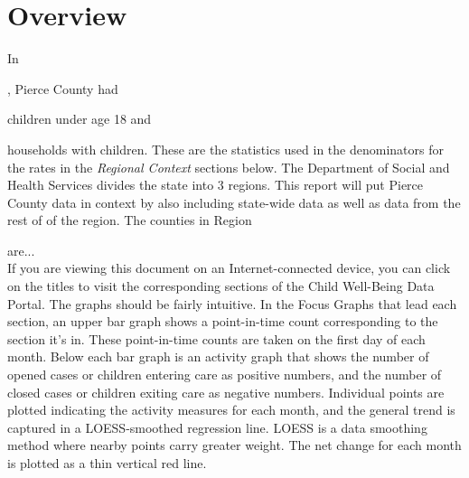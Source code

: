 \documentclass{article}
\begin{document}

\vspace{12pt}

\section*{Overview}

In 

{\ttfamily\noindent\bfseries\color{errorcolor}{\\Error in eval(expr, envir, enclos) : object 'context\_year' not found}}, Pierce County had {

{\ttfamily\noindent\bfseries\color{errorcolor}{\\Error in formatC(focus\_pop\_person, big.mark = ",", format = "d") : \\\ \ object 'focus\_pop\_person' not found}}} children under age 18 and {

{\ttfamily\noindent\bfseries\color{errorcolor}{\\Error in formatC(focus\_pop\_house, big.mark = ",", format = "d") : \\\ \ object 'focus\_pop\_house' not found}}} households with children. These are the statistics used in the denominators for the rates in the \emph{Regional Context} sections below. The Department of Social and Health Services divides the state into 3 regions. This report will put Pierce County data in context by also including state-wide data as well as data from the rest of of the region. The counties in Region 

{\ttfamily\noindent\bfseries\color{errorcolor}{\\Error in eval(expr, envir, enclos) : object 'region\_cd' not found}} are...\\

If you are viewing this document on an Internet-connected device, you can click on the titles to visit the corresponding sections of the Child Well-Being Data Portal. The graphs should be fairly intuitive. In the Focus Graphs that lead each section, an upper bar graph shows a point-in-time count corresponding to the section it's in. These point-in-time counts are taken on the first day of each month. Below each bar graph is an activity graph that shows the number of opened cases or children entering care as positive numbers, and the number of closed cases or children exiting care as negative numbers. Individual points are plotted indicating the activity measures for each month, and the general trend is captured in a \textsc{LOESS}-smoothed regression line.
\textsc{LOESS} is a data smoothing method where nearby points carry greater weight.
The net change for each month is plotted as a thin vertical red line.\\
\end{document}
